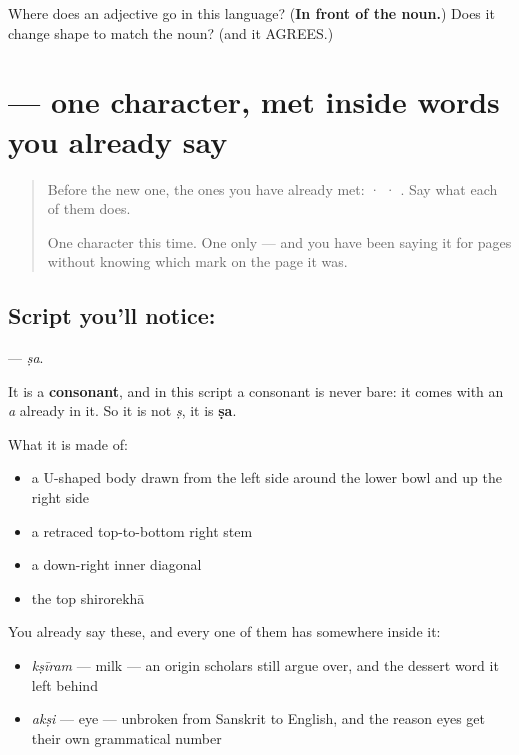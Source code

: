\begin{tcolorbox}[breakable,colback=teal!4,colframe=teal!35!black,title={Before you move on}]
Where does an adjective go in this language? (\textbf{In front of the noun.}) Does it change shape to match the noun? (and it AGREES.)
\end{tcolorbox}
\section[\texorpdfstring{\sk{ष} (ṣa)}{ष (ṣa)}]{ — one character, met inside words you already say}

\label{lesson:SA-S118-letter-ssa}



\begin{quote}
Before the new one, the ones you have already met:  ·  · . Say what each of them does.

One character this time. One only — and you have been saying it for pages without knowing which mark on the page it was.
\end{quote}

\subsection*{Script you'll notice: }
\textbf{} — \emph{ṣa}.

It is a \textbf{consonant}, and in this script a consonant is never bare: it comes with an \emph{a} already in it. So it is not \emph{ṣ}, it is \textbf{ṣa}.

What it is made of:

\begin{itemize}
\raggedright
  \item a U-shaped body drawn from the left side around the lower bowl and up the right side
  \item a retraced top-to-bottom right stem
  \item a down-right inner diagonal
  \item the top shirorekhā
\end{itemize}

You already say these, and every one of them has  somewhere inside it:

\begin{itemize}
\raggedright
  \item \textbf{} \emph{kṣīram} — milk — an origin scholars still argue over, and the dessert word it left behind
  \item \textbf{} \emph{akṣi} — eye — unbroken from Sanskrit to English, and the reason eyes get their own grammatical number
\end{itemize}

